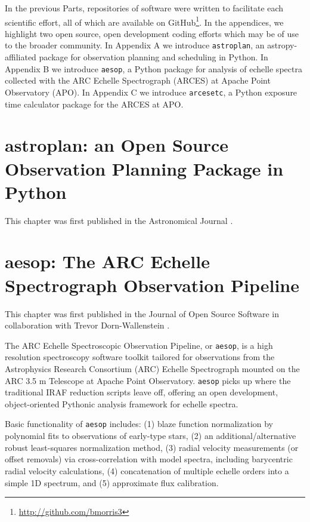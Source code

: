\documentclass[12pt, twoside]{uwthesis}
\begin{document}
%
%
\appendix
\raggedbottom\sloppy

\pagebreak
In the previous Parts, repositories of software were written to facilitate each scientific effort, all of which are available on GitHub\footnote{\url{http://github.com/bmorris3}}. In the appendices, we highlight two open source, open development coding efforts which may be of use to the broader community. In Appendix A we introduce {\tt astroplan}, an astropy-affiliated package for observation planning and scheduling in Python. In Appendix B we introduce {\tt aesop}, a Python package for analysis of echelle spectra collected with the ARC Echelle Spectrograph (ARCES) at Apache Point Observatory (APO). In Appendix C we introduce {\tt arcesetc}, a Python exposure time calculator package for the ARCES at APO.  

\chapter{astroplan: an Open Source Observation Planning Package in Python} \label{chap:astroplan}

This chapter was first published in the Astronomical Journal \citep{astroplan}.



\chapter{aesop: The ARC Echelle Spectrograph Observation Pipeline} \label{chap:aesop}

This chapter was first published in the Journal of Open Source Software in collaboration with Trevor Dorn-Wallenstein \citep{aesop}.

The ARC Echelle Spectroscopic Observation Pipeline, or {\tt aesop}, is a high resolution spectroscopy software toolkit tailored for observations from the Astrophysics Research Consortium (ARC) Echelle Spectrograph mounted on the ARC 3.5 m Telescope at Apache Point Observatory. {\tt aesop} picks up where the traditional IRAF reduction scripts leave off, offering an open development, object-oriented Pythonic analysis framework for echelle spectra.

Basic functionality of {\tt aesop} includes: (1) blaze function normalization by polynomial fits to observations of early-type stars, (2) an additional/alternative robust least-squares normalization method, (3) radial velocity measurements (or offset removals) via cross-correlation with model spectra, including barycentric radial velocity calculations, (4) concatenation of multiple echelle orders into a simple 1D spectrum, and (5) approximate flux calibration.
\end{document}
